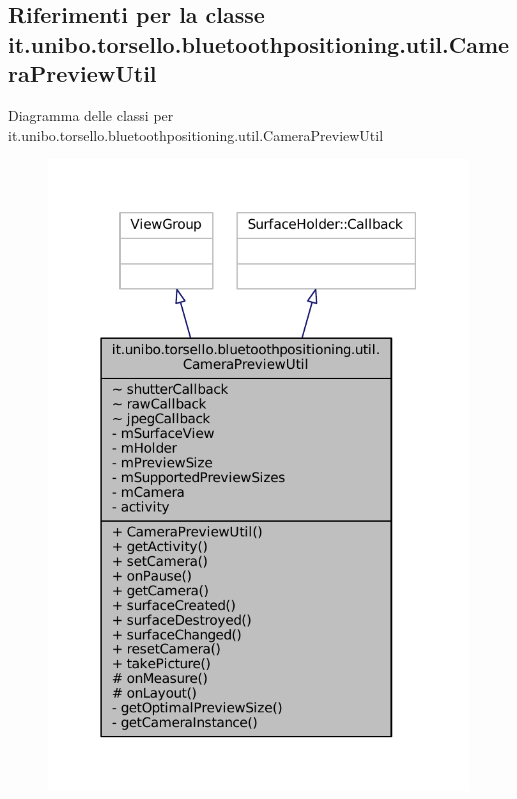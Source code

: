 \hypertarget{classit_1_1unibo_1_1torsello_1_1bluetoothpositioning_1_1util_1_1CameraPreviewUtil}{}\subsection{Riferimenti per la classe it.\+unibo.\+torsello.\+bluetoothpositioning.\+util.\+Camera\+Preview\+Util}
\label{classit_1_1unibo_1_1torsello_1_1bluetoothpositioning_1_1util_1_1CameraPreviewUtil}


Diagramma delle classi per it.\+unibo.\+torsello.\+bluetoothpositioning.\+util.\+Camera\+Preview\+Util
\nopagebreak
\begin{figure}[H]
\begin{center}
\leavevmode
\includegraphics[width=316pt]{classit_1_1unibo_1_1torsello_1_1bluetoothpositioning_1_1util_1_1CameraPreviewUtil__inherit__graph}
\end{center}
\end{figure}


